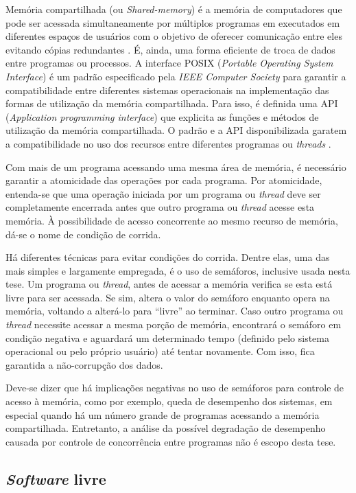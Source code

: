 Memória compartilhada (ou \textit{Shared-memory}) é a memória de computadores que pode ser
acessada simultaneamente por múltiplos programas em executados em diferentes
espaços de usuários com o objetivo de oferecer comunicação entre
eles evitando cópias redundantes \cite{Robbins2003}. É, ainda, uma forma eficiente
de troca de dados entre programas ou processos. A interface POSIX
(\textit{Portable Operating System Interface}) \cite{Walli1995} é um
padrão especificado pela \textit{IEEE Computer Society} para garantir
a compatibilidade entre diferentes sistemas operacionais na implementação
das formas de utilização da memória compartilhada. Para isso, é definida
uma API (\textit{Application programming interface}) que explicita as funções
e métodos de utilização da memória compartilhada. O padrão e a API disponibilizada
garatem a compatibilidade no uso dos recursos entre diferentes programas ou \textit{threads}
\cite{Atlidakis2016}.

Com mais de um programa acessando uma mesma área de memória, é necessário garantir a atomicidade
das operações por cada programa. Por atomicidade, entenda-se que uma operação iniciada por um
programa ou \textit{thread} deve ser completamente encerrada antes que outro programa ou
\textit{thread} acesse esta memória. À possibilidade de acesso concorrente ao mesmo recurso
de memória, dá-se o nome de condição de corrida.

Há diferentes técnicas para evitar condições do corrida. Dentre elas, uma das mais simples e
largamente empregada, é o uso de semáforos, inclusive usada nesta tese.
Um programa ou \textit{thread}, antes de acessar a memória
verifica se esta está livre para ser acessada. Se sim, altera o valor do semáforo enquanto opera na
memória, voltando a alterá-lo para ``livre'' ao terminar. Caso outro programa ou \textit{thread}
necessite acessar a mesma porção de memória, encontrará o semáforo em condição negativa e aguardará
um determinado tempo (definido pelo sistema operacional ou pelo próprio usuário) até tentar novamente.
Com isso, fica garantida a não-corrupção dos dados.

Deve-se dizer que há implicações negativas no uso de semáforos para controle de acesso à memória,
como por exemplo, queda de desempenho dos sistemas, em especial quando há um número grande
de programas acessando a memória compartilhada. Entretanto, a análise da possível degradação
de desempenho causada por controle de concorrência entre programas não é escopo desta tese.

\subsection{\textit{Software} livre}
\label{subsec:sl}

